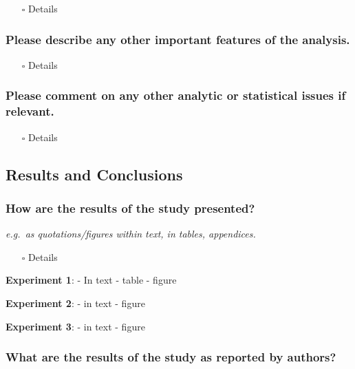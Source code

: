 \documentclass[
  doc, a4paper]{apa7}
\providecommand{\tightlist}{%
  \setlength{\itemsep}{0pt}\setlength{\parskip}{0pt}}
\begin{document}
\begin{itemize}
\tightlist
\item[$\square$]
  Details
\end{itemize}

\subsubsection{Please describe any other important features of the analysis.}\label{please-describe-any-other-important-features-of-the-analysis.}

\begin{itemize}
\tightlist
\item[$\square$]
  Details
\end{itemize}

\subsubsection{Please comment on any other analytic or statistical issues if relevant.}\label{please-comment-on-any-other-analytic-or-statistical-issues-if-relevant.}

\begin{itemize}
\tightlist
\item[$\square$]
  Details
\end{itemize}

\subsection{Results and Conclusions}\label{results-and-conclusions}

\subsubsection{How are the results of the study presented?}\label{how-are-the-results-of-the-study-presented}

\emph{e.g.~as quotations/figures within text, in tables, appendices.}

\begin{itemize}
\tightlist
\item[$\square$]
  Details
\end{itemize}

\textbf{Experiment 1}:
- In text
- table
- figure

\textbf{Experiment 2}:
- in text
- figure

\textbf{Experiment 3}:
- in text
- figure

\subsubsection{What are the results of the study as reported by authors?}\label{what-are-the-results-of-the-study-as-reported-by-authors}
\end{document}
